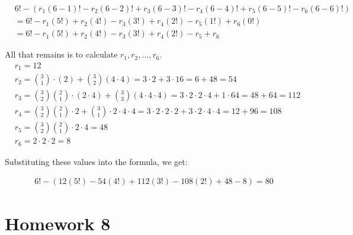 \documentclass{report}
\begin{document}
{{    \begin{align*}
         & 6! - (r_1(6 - 1)! - r_2(6 - 2)! + r_3(6 - 3)! - r_4(6 - 4)! + r_5(6 - 5)! - r_6(6 - 6)!) \\
         & = 6! - r_1(5!) + r_2(4!) - r_3(3!) + r_4(2!) - r_5(1!) + r_6(0!)                         \\
         & = 6! - r_1(5!) + r_2(4!) - r_3(3!) + r_4(2!) - r_5 + r_6
    \end{align*}

    All that remains is to calculate $r_1, r_2, \dots, r_6$. \\

    \begin{align*}
         & r_1 = 12                                                                                                                                         \\
         & r_2 = \binom{3}{1}\cdot (2)+ \binom{3}{2} (4\cdot 4) = 3 \cdot 2 + 3 \cdot 16 = 6 + 48 = 54                                                      \\
         & r_3 = \binom{3}{2} \binom{2}{1} \cdot (2 \cdot 4) + \binom{3}{3} (4 \cdot 4 \cdot 4) = 3\cdot 2 \cdot 2 \cdot 4 + 1\cdot 64 = 48+64= 112         \\
         & r_4 = \binom{3}{2} \binom{2}{1} \cdot 2 + \binom{3}{1} \cdot 2 \cdot 4 \cdot 4 = 3\cdot 2\cdot 2\cdot 2 + 3\cdot 2\cdot 4\cdot 4 = 12 + 96 = 108 \\
         & r_5 = \binom{3}{2} \binom{2}{1} \cdot 2 \cdot 4 = 48                                                                                             \\
         & r_6 = 2 \cdot 2 \cdot 2 = 8
    \end{align*}

    Substituting these values into the formula, we get:

    \begin{align*}
        6! - (12(5!) - 54(4!) + 112(3!) - 108(2!) + 48 - 8) = 80
    \end{align*}
}

\section{Homework 8}

}
\end{document}
